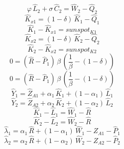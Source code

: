 \begin{dmath}
{{\varphi}}\, {{\hat{L}_{2}}}+{{\sigma}}\, {{\hat{C}_{2}}}={{\hat{W}_{2}}}-{{\hat{Q}_{2}}}
\end{dmath}
\begin{dmath}
{{\hat{K}_{x1}}}=\left(1-{{\delta}}\right)\, {{\hat{K}_{1}}}-{{\hat{Q}_{1}}}
\end{dmath}
\begin{dmath}
{{\hat{K}_{1}}}-{{\hat{K}_{x1}}}={{sunspot_{K1}}}
\end{dmath}
\begin{dmath}
{{\hat{K}_{x2}}}=\left(1-{{\delta}}\right)\, {{\hat{K}_{2}}}-{{\hat{Q}_{2}}}
\end{dmath}
\begin{dmath}
{{\hat{K}_{2}}}-{{\hat{K}_{x2}}}={{sunspot_{K2}}}
\end{dmath}
\begin{dmath}
0=\left({{\hat{R}}}-{{\hat{P}_{1}}}\right)\, {{\beta}}\, \left(\frac{1}{{{\beta}}}-\left(1-{{\delta}}\right)\right)
\end{dmath}
\begin{dmath}
0=\left({{\hat{R}}}-{{\hat{P}_{1}}}\right)\, {{\beta}}\, \left(\frac{1}{{{\beta}}}-\left(1-{{\delta}}\right)\right)
\end{dmath}
\begin{dmath}
{{\hat{Y}_{1}}}={{\hat{Z}_{A1}}}+{{\alpha_{1}}}\, {{\hat{K}_{1}}}+\left(1-{{\alpha_{1}}}\right)\, {{\hat{L}_{1}}}
\end{dmath}
\begin{dmath}
{{\hat{Y}_{2}}}={{\hat{Z}_{A2}}}+{{\alpha_{2}}}\, {{\hat{K}_{2}}}+\left(1-{{\alpha_{2}}}\right)\, {{\hat{L}_{2}}}
\end{dmath}
\begin{dmath}
{{\hat{K}_{1}}}-{{\hat{L}_{1}}}={{\hat{W}_{1}}}-{{\hat{R}}}
\end{dmath}
\begin{dmath}
{{\hat{K}_{2}}}-{{\hat{L}_{2}}}={{\hat{W}_{2}}}-{{\hat{R}}}
\end{dmath}
\begin{dmath}
{{\hat{\lambda}_{1}}}={{\alpha_{1}}}\, {{\hat{R}}}+\left(1-{{\alpha_{1}}}\right)\, {{\hat{W}_{1}}}-{{\hat{Z}_{A1}}}-{{\hat{P}_{1}}}
\end{dmath}
\begin{dmath}
{{\hat{\lambda}_{2}}}={{\alpha_{2}}}\, {{\hat{R}}}+\left(1-{{\alpha_{2}}}\right)\, {{\hat{W}_{2}}}-{{\hat{Z}_{A2}}}-{{\hat{P}_{2}}}
\end{dmath}
